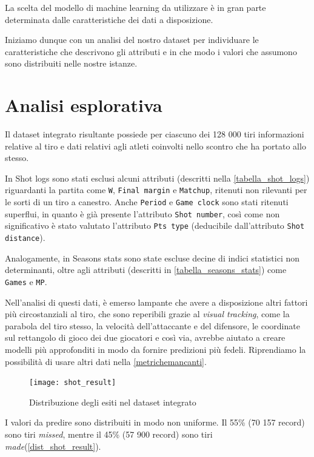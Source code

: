 La scelta del modello di machine learning da utilizzare è in gran parte determinata dalle caratteristiche dei dati a disposizione.

Iniziamo dunque con un analisi del nostro dataset per individuare le caratteristiche che descrivono gli attributi e in che modo i valori che assumono sono distribuiti nelle nostre istanze.

\section{Analisi esplorativa}

Il dataset integrato risultante possiede per ciascuno dei 128 000 tiri informazioni relative al tiro e dati relativi agli atleti coinvolti nello scontro che ha portato allo stesso.
\par

In Shot logs sono stati esclusi alcuni attributi (descritti nella \autoref{tabella_shot_logs}) riguardanti la partita come \texttt{W}, \texttt{Final margin} e \texttt{Matchup}, ritenuti non rilevanti per le sorti di un tiro a canestro.
Anche \texttt{Period} e \texttt{Game clock} sono stati ritenuti superflui, in quanto è già presente l'attributo \texttt{Shot number}, così come non significativo è stato valutato l'attributo \texttt{Pts type} (deducibile dall'attributo \texttt{Shot distance}). 
\par
Analogamente, in Seasons stats sono state escluse decine di indici statistici non determinanti, oltre agli attributi (descritti in \autoref{tabella_seasons_stats}) come \texttt{Games} e \texttt{MP}.

\par
Nell'analisi di questi dati, è emerso lampante che avere a disposizione altri fattori più circostanziali al tiro, che sono reperibili grazie al \textit{visual tracking}, come la parabola del tiro stesso, la velocità dell'attaccante e del difensore, le coordinate sul rettangolo di gioco dei due giocatori e così via, avrebbe aiutato a creare modelli più approfonditi in modo da fornire predizioni più fedeli.
Riprendiamo la possibilità di usare altri dati nella \autoref{metrichemancanti}.

\begin{figure}[H]
\caption{Distribuzione degli esiti nel dataset integrato}
\label{dist_shot_result}
	\texttt{[image: shot\_result]}
\end{figure}

I valori da predire sono distribuiti in modo non uniforme. Il 55\% (70 157 record) sono tiri \textit{missed}, mentre il 45\% (57 900 record) sono tiri \textit{made}(\autoref{dist_shot_result}).

